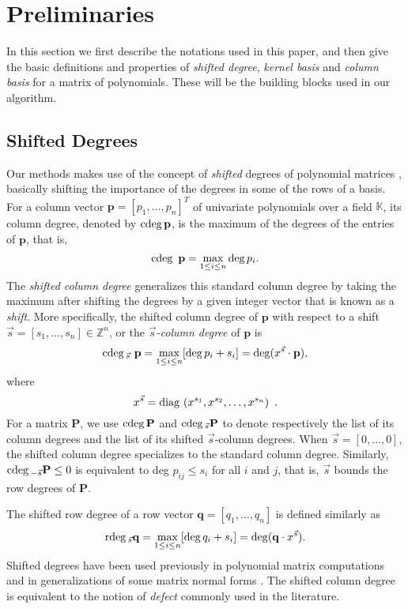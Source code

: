 
\section{Preliminaries}

In this section we first describe the notations used in this paper,
and then give the basic definitions and properties of {\em shifted
degree}, {\em kernel basis} and {\em column basis} for a matrix
of polynomials. These will be the building blocks used in our algorithm.


\subsection{Shifted Degrees}

Our methods makes use of the concept of {\em shifted} degrees of
polynomial matrices \citet{BLV:1999}, basically shifting the importance
of the degrees in some of the rows of a basis. For a column vector
$\mathbf{p}=\left[p_{1},\dots,p_{n}\right]^{T}$ of univariate polynomials
over a field $\mathbb{K}$, its column degree, denoted by ${\rm cdeg}\,\mathbf{p}$,
is the maximum of the degrees of the entries of $\mathbf{p}$, that
is, 
\[
{\rm cdeg}\,~\mathbf{p}=\max_{1\le i\le n}\deg p_{i}.
\]
 The \emph{shifted column degree} generalizes this standard column
degree by taking the maximum after shifting the degrees by a given
integer vector that is known as a \emph{shift}. More specifically,
the shifted column degree of $\mathbf{p}$ with respect to a shift
$\vec{s}=\left[s_{1},\dots,s_{n}\right]\in\mathbb{Z}^{n}$, or the
\emph{$\vec{s}$-column degree} of $\mathbf{p}$ is 
\[
{\rm cdeg}\,_{\vec{s}}~\mathbf{p}=\max_{1\le i\le n}[\deg p_{i}+s_{i}]=\deg(x^{\vec{s}}\cdot\mathbf{p}),
\]
 where 
\[
x^{\vec{s}}={\rm diag}\,\left(x^{s_{1}},x^{s_{2}},\dots,x^{s_{n}}\right)~.
\]
 For a matrix $\mathbf{P}$, we use ${\rm cdeg}\,\mathbf{P}$ and ${\rm cdeg}\,_{\vec{s}}\mathbf{P}$
to denote respectively the list of its column degrees and the list
of its shifted $\vec{s}$-column degrees. When $\vec{s}=\left[0,\dots,0\right]$,
the shifted column degree specializes to the standard column degree.
Similarly, ${\rm cdeg}\,_{-\vec{s}}\mathbf{P}\leq0$ is equivalent to deg
$p_{ij}\leq s_{i}$ for all $i$ and $j$, that is, $\vec{s}$ bounds
the row degrees of $\mathbf{P}$.

The shifted row degree of a row vector \textbf{$\mathbf{q}=\left[q_{1},\dots,q_{n}\right]$}
is defined similarly as 
\[
{\rm rdeg}\,_{\vec{s}}\mathbf{q}=\max_{1\le i\le n}[\deg q_{i}+s_{i}]=\deg(\mathbf{q}\cdot x^{\vec{s}}).
\]
 Shifted degrees have been used previously in polynomial matrix computations
and in generalizations of some matrix normal forms \citet{BLV:jsc06}.
The shifted column degree is equivalent to the notion of \emph{defect}
commonly used in the literature.

